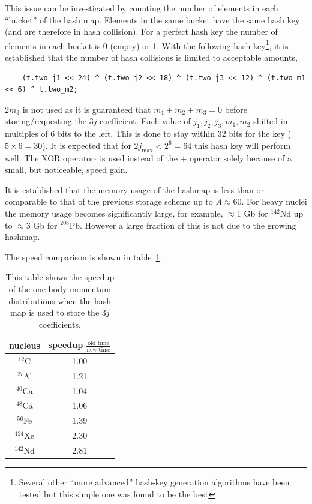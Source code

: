 \documentclass[10pt]{article}
\begin{document}
This issue can be investigated by counting the number of elements in each ``bucket'' of the hash map.
Elements in the same bucket have the same hash key (and are therefore in hash collision).
For a perfect hash key the number of elements in each bucket is 0 (empty) or 1.
With the following hash key\footnote{Several other ``more advanced'' hash-key generation algorithms have been tested but this simple one was found to be the best}, it is established that the number of hash collisions is limited to acceptable amounts,
\begin{verbatim}
	(t.two_j1 << 24) ^ (t.two_j2 << 18) ^ (t.two_j3 << 12) ^ (t.two_m1 << 6) ^ t.two_m2;
\end{verbatim}
$2 m_3$ is not used as it is guaranteed that $m_1+m_2+m_3=0$ before storing/requesting the $3j$ coefficient.
Each value of $j_1,j_2,j_3,m_1,m_2$ shifted in multiples of $6$ bits to the left.
This is done to stay within $32$ bits for the key ($5 \times 6 = 30$).
It is expected that for $2j_{\text{max}} < 2^{6} = 64$ this hash key will perform well.
The XOR operator $\hat{}$ is used instead of the $+$ operator solely because of a small, but noticeable, speed gain.

It is established that the memory usage of the hashmap is less than or comparable to that of the previous storage scheme up to $A \approx 60$.
For heavy nuclei the memory usage becomes significantly large, for example, $\approx$1 Gb for $^{142}$Nd up to $\approx$3 Gb for $^{208}$Pb. However a large fraction of this is not due to the growing hashmap.

The speed comparison is shown in table~\ref{tab:speed_comp}.

\begin{table}
\centering
\begin{tabular}{c | c}
nucleus & speedup $\frac{\text{old time}}{\text{new time}}$ \\ \hline
$^{12}$C   & 1.00 \\
$^{27}$Al  & 1.21 \\
$^{40}$Ca  & 1.04 \\
$^{48}$Ca  & 1.06 \\
$^{56}$Fe  & 1.39 \\
$^{124}$Xe & 2.30 \\
$^{142}$Nd & 2.81   
\end{tabular}
\caption{This table shows the speedup of the one-body momentum distributions when the hash map is used to store the $3j$ coefficients.}
\label{tab:speed_comp}
\end{table}
\end{document}
